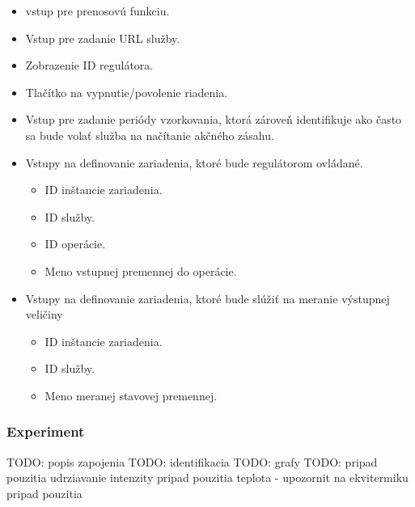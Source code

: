\begin{itemize}
  \item vstup pre prenosovú funkciu.
  \item Vstup pre zadanie URL služby.
  \item Zobrazenie ID regulátora.
  \item Tlačítko na vypnutie/povolenie riadenia.
  \item Vstup pre zadanie periódy vzorkovania, ktorá zároveň identifikuje ako často sa bude volať služba na načítanie akčného zásahu.
  \item Vstupy na definovanie zariadenia, ktoré bude regulátorom ovládané.  
  \begin{itemize}
    \item ID inštancie zariadenia.
    \item ID služby.    
    \item ID operácie.    
    \item Meno vstupnej premennej do operácie.
  \end{itemize} 
  \item Vstupy na definovanie zariadenia, ktoré bude slúžiť na meranie výstupnej veličiny
  \begin{itemize}
    \item ID inštancie zariadenia.
    \item ID služby.    
    \item Meno meranej stavovej premennej.    
  \end{itemize}     
\end{itemize}

\subsubsection{Experiment}

TODO: popis zapojenia
TODO: identifikacia
TODO: grafy
TODO: 
pripad pouzitia udrziavanie intenzity
pripad pouzitia teplota - upozornit na ekvitermiku
pripad pouzitia
